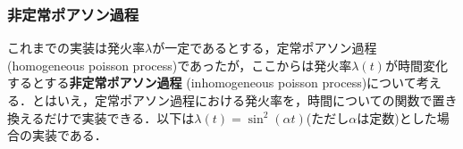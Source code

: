 \subsubsection{非定常ポアソン過程}これまでの実装は発火率$\lambda$が一定であるとする，定常ポアソン過程 (homogeneous poisson process)であったが，ここからは発火率$\lambda(t)$が時間変化するとする\textbf{非定常ポアソン過程} (inhomogeneous poisson process)について考える．とはいえ，定常ポアソン過程における発火率を，時間についての関数で置き換えるだけで実装できる．以下は$\lambda(t)=\sin^2(\alpha t)$(ただし$\alpha$は定数)とした場合の実装である．